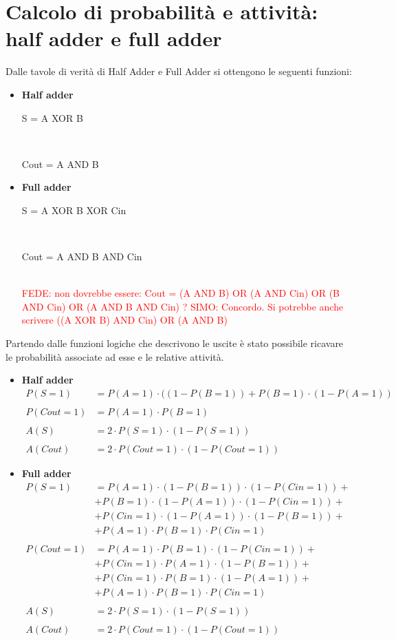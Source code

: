 \documentclass[11pt,  english, makeidx, a4paper, titlepage, oneside]{book}
\begin{document}
\section{Calcolo di probabilità e attività: half adder e full adder} 
Dalle tavole di verità di Half Adder e Full Adder si ottengono le seguenti funzioni:
\begin{itemize}
	\item \textbf{Half adder} \\
	\centerline{S = A XOR B} \\
	\centerline{Cout = A AND B}
	\item \textbf{Full adder} \\
	\centerline{S = A XOR B XOR Cin} \\
	\centerline{Cout = A AND B AND Cin} \\
	\textcolor{red}{FEDE: non dovrebbe essere: Cout = (A AND B) OR (A AND Cin) OR (B AND Cin) OR (A AND B AND Cin) ? SIMO: Concordo. Si potrebbe anche scrivere ((A XOR B) AND Cin) OR (A AND B)}\\
\end{itemize}
Partendo dalle funzioni logiche che descrivono le uscite è stato possibile ricavare le probabilità
associate ad esse e le relative attività.
\begin{itemize}
	\item \textbf{Half adder}\\
	\begin{align*}
	P(S=1) &= P(A=1) \cdot ((1-P(B=1)) + P(B=1) \cdot (1-P(A=1))\\\\
	P(Cout=1) & = P(A=1) \cdot P(B=1)\\\\
	A(S) &= 2 \cdot P(S=1) \cdot (1-P(S=1))\\\\
    A(Cout) &= 2 \cdot P(Cout=1) \cdot (1-P(Cout=1)) 
    \end{align*}	
	\item \textbf{Full adder}
	\begin{align*}
	P(S=1) & = P(A=1) \cdot(1-P(B=1)) \cdot (1-P(Cin=1)) + \\ 
	          & + P(B=1) \cdot(1-P(A=1)) \cdot (1-P(Cin=1)) + \\
	          & + P(Cin=1) \cdot (1-P(A=1)) \cdot(1-P(B=1)) + \\
	          & + P(A=1) \cdot P(B=1) \cdot P(Cin=1)\\\\
	 P(Cout=1) & = P(A=1) \cdot P(B=1) \cdot (1-P(Cin=1)) +\\
	 					& + P(Cin=1) \cdot P(A=1) \cdot (1-P(B=1)) +\\
	 					& + P(Cin=1) \cdot P(B=1) \cdot (1-P(A=1)) +\\
	 					& + P(A=1) \cdot P(B=1) \cdot P(Cin=1)\\\\
	 A(S) & = 2 \cdot P(S=1) \cdot (1-P(S=1))\\\\
	A(Cout) & = 2 \cdot P(Cout=1) \cdot (1-P(Cout=1))
	\end{align*}	
\end{itemize} 
\end{document}
